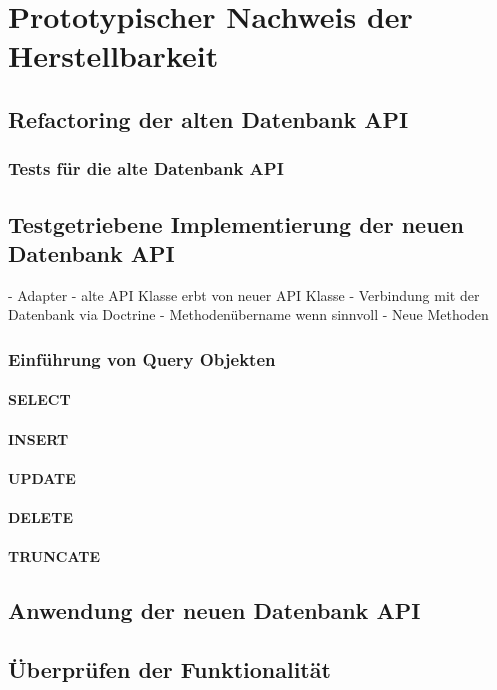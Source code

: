 \chapter{Prototypischer Nachweis der Herstellbarkeit}
\label{ch:protoype}

\section{Refactoring der alten Datenbank API}
\subsection{Tests für die alte Datenbank API}

\section{Testgetriebene Implementierung der neuen Datenbank API}
- Adapter
- alte API Klasse erbt von neuer API Klasse
- Verbindung mit der Datenbank via Doctrine
- Methodenübername wenn sinnvoll
- Neue Methoden

\subsection{Einführung von Query Objekten}
\subsubsection{SELECT}
\subsubsection{INSERT}
\subsubsection{UPDATE}
\subsubsection{DELETE}
\subsubsection{TRUNCATE}

\section{Anwendung der neuen Datenbank API}
\section{Überprüfen der Funktionalität}
